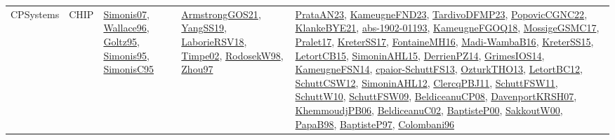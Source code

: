 {\begin{longtable}{llp{6cm}p{6cm}p{6cm}}
CPSystems & CHIP & \href{articles/Simonis07.pdf}{Simonis07}\cite{Simonis07}, \href{articles/Wallace96.pdf}{Wallace96}\cite{Wallace96}, \href{papers/Goltz95.pdf}{Goltz95}\cite{Goltz95}, \href{papers/Simonis95.pdf}{Simonis95}\cite{Simonis95}, \href{papers/SimonisC95.pdf}{SimonisC95}\cite{SimonisC95} & \href{papers/ArmstrongGOS21.pdf}{ArmstrongGOS21}\cite{ArmstrongGOS21}, \href{papers/YangSS19.pdf}{YangSS19}\cite{YangSS19}, \href{articles/LaborieRSV18.pdf}{LaborieRSV18}\cite{LaborieRSV18}, \href{articles/Timpe02.pdf}{Timpe02}\cite{Timpe02}, \href{papers/RodosekW98.pdf}{RodosekW98}\cite{RodosekW98}, \href{articles/Zhou97.pdf}{Zhou97}\cite{Zhou97} & \href{articles/PrataAN23.pdf}{PrataAN23}\cite{PrataAN23}, \href{papers/KameugneFND23.pdf}{KameugneFND23}\cite{KameugneFND23}, \href{papers/TardivoDFMP23.pdf}{TardivoDFMP23}\cite{TardivoDFMP23}, \href{papers/PopovicCGNC22.pdf}{PopovicCGNC22}\cite{PopovicCGNC22}, \href{papers/KlankeBYE21.pdf}{KlankeBYE21}\cite{KlankeBYE21}, \href{articles/abs-1902-01193.pdf}{abs-1902-01193}\cite{abs-1902-01193}, \href{papers/KameugneFGOQ18.pdf}{KameugneFGOQ18}\cite{KameugneFGOQ18}, \href{papers/MossigeGSMC17.pdf}{MossigeGSMC17}\cite{MossigeGSMC17}, \href{papers/Pralet17.pdf}{Pralet17}\cite{Pralet17}, \href{articles/KreterSS17.pdf}{KreterSS17}\cite{KreterSS17}, \href{papers/FontaineMH16.pdf}{FontaineMH16}\cite{FontaineMH16}, \href{papers/Madi-WambaB16.pdf}{Madi-WambaB16}\cite{Madi-WambaB16}, \href{papers/KreterSS15.pdf}{KreterSS15}\cite{KreterSS15}, \href{articles/LetortCB15.pdf}{LetortCB15}\cite{LetortCB15}, \href{articles/SimoninAHL15.pdf}{SimoninAHL15}\cite{SimoninAHL15}, \href{papers/DerrienPZ14.pdf}{DerrienPZ14}\cite{DerrienPZ14}, \href{articles/GrimesIOS14.pdf}{GrimesIOS14}\cite{GrimesIOS14}, \href{articles/KameugneFSN14.pdf}{KameugneFSN14}\cite{KameugneFSN14}, \href{papers/cpaior-SchuttFS13.pdf}{cpaior-SchuttFS13}\cite{cpaior-SchuttFS13}, \href{articles/OzturkTHO13.pdf}{OzturkTHO13}\cite{OzturkTHO13}, \href{papers/LetortBC12.pdf}{LetortBC12}\cite{LetortBC12}, \href{papers/SchuttCSW12.pdf}{SchuttCSW12}\cite{SchuttCSW12}, \href{papers/SimoninAHL12.pdf}{SimoninAHL12}\cite{SimoninAHL12}, \href{papers/ClercqPBJ11.pdf}{ClercqPBJ11}\cite{ClercqPBJ11}, \href{articles/SchuttFSW11.pdf}{SchuttFSW11}\cite{SchuttFSW11}, \href{papers/SchuttW10.pdf}{SchuttW10}\cite{SchuttW10}, \href{papers/SchuttFSW09.pdf}{SchuttFSW09}\cite{SchuttFSW09}, \href{papers/BeldiceanuCP08.pdf}{BeldiceanuCP08}\cite{BeldiceanuCP08}, \href{papers/DavenportKRSH07.pdf}{DavenportKRSH07}\cite{DavenportKRSH07}, \href{papers/KhemmoudjPB06.pdf}{KhemmoudjPB06}\cite{KhemmoudjPB06}, \href{papers/BeldiceanuC02.pdf}{BeldiceanuC02}\cite{BeldiceanuC02}, \href{articles/BaptisteP00.pdf}{BaptisteP00}\cite{BaptisteP00}, \href{articles/SakkoutW00.pdf}{SakkoutW00}\cite{SakkoutW00}, \href{articles/PapaB98.pdf}{PapaB98}\cite{PapaB98}, \href{papers/BaptisteP97.pdf}{BaptisteP97}\cite{BaptisteP97}, \href{papers/Colombani96.pdf}{Colombani96}\cite{Colombani96}\\

\end{longtable}}
